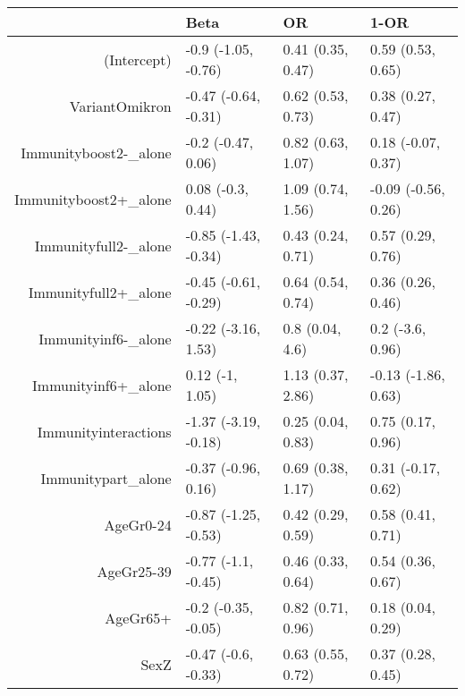 \begin{table}[ht]
\centering
\begin{tabular}{rlll}
  \hline
 & Beta & OR & 1-OR \\ 
  \hline
(Intercept) & -0.9 (-1.05, -0.76) & 0.41 (0.35, 0.47) & 0.59 (0.53, 0.65) \\ 
  VariantOmikron & -0.47 (-0.64, -0.31) & 0.62 (0.53, 0.73) & 0.38 (0.27, 0.47) \\ 
  Immunityboost2-\_alone & -0.2 (-0.47, 0.06) & 0.82 (0.63, 1.07) & 0.18 (-0.07, 0.37) \\ 
  Immunityboost2+\_alone & 0.08 (-0.3, 0.44) & 1.09 (0.74, 1.56) & -0.09 (-0.56, 0.26) \\ 
  Immunityfull2-\_alone & -0.85 (-1.43, -0.34) & 0.43 (0.24, 0.71) & 0.57 (0.29, 0.76) \\ 
  Immunityfull2+\_alone & -0.45 (-0.61, -0.29) & 0.64 (0.54, 0.74) & 0.36 (0.26, 0.46) \\ 
  Immunityinf6-\_alone & -0.22 (-3.16, 1.53) & 0.8 (0.04, 4.6) & 0.2 (-3.6, 0.96) \\ 
  Immunityinf6+\_alone & 0.12 (-1, 1.05) & 1.13 (0.37, 2.86) & -0.13 (-1.86, 0.63) \\ 
  Immunityinteractions & -1.37 (-3.19, -0.18) & 0.25 (0.04, 0.83) & 0.75 (0.17, 0.96) \\ 
  Immunitypart\_alone & -0.37 (-0.96, 0.16) & 0.69 (0.38, 1.17) & 0.31 (-0.17, 0.62) \\ 
  AgeGr0-24 & -0.87 (-1.25, -0.53) & 0.42 (0.29, 0.59) & 0.58 (0.41, 0.71) \\ 
  AgeGr25-39 & -0.77 (-1.1, -0.45) & 0.46 (0.33, 0.64) & 0.54 (0.36, 0.67) \\ 
  AgeGr65+ & -0.2 (-0.35, -0.05) & 0.82 (0.71, 0.96) & 0.18 (0.04, 0.29) \\ 
  SexZ & -0.47 (-0.6, -0.33) & 0.63 (0.55, 0.72) & 0.37 (0.28, 0.45) \\ 
   \hline
\end{tabular}
\end{table}
